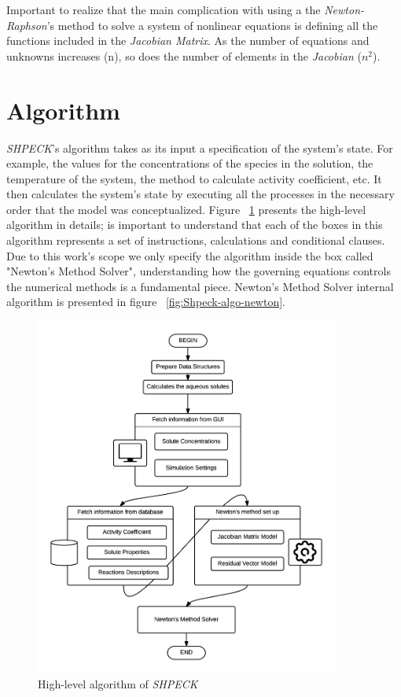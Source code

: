 Important to realize that the main complication with using a the \emph{Newton-Raphson}'s method to solve a system of nonlinear equations is defining all the functions included in the \emph{Jacobian Matrix}. As the number of equations and unknowns increases (n), so does the number of elements in the \emph{Jacobian} ($n^2$).

\section{Algorithm}

\emph{SHPECK}'s algorithm takes as its input a specification of the system's state. For example, the values for the concentrations of the species in the solution, the temperature of the system, the method to calculate activity coefficient, etc. It then calculates the system's state by executing all the processes in the necessary order that the model was conceptualized. 
Figure ~\ref{fig:Shpeck-algo} presents the high-level algorithm in details; is important to understand that each of the boxes in this algorithm represents a set of instructions, calculations and conditional clauses. Due to this work's scope we only specify the algorithm inside the box called "Newton's Method Solver", understanding how the governing equations controls the numerical methods is a fundamental piece. Newton's Method Solver internal algorithm is presented in figure ~\ref{fig:Shpeck-algo-newton}. 
\begin{figure}[ht!]
\centering
\includegraphics[width=100mm]{figures/Shpeck_algo3.png}
\caption{High-level algorithm of \emph{SHPECK}}
\label{fig:Shpeck-algo}
\end{figure}
